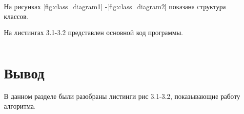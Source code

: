 На рисунках \ref{fig:class_diagram1} -\ref{fig:class_diagram2} показана структура классов.

\begin{figure}[ht!]
\end{figure}

\begin{figure}[ht!]
\end{figure}

На листингах 3.1-3.2 представлен основной код программы.

\begin{lstlisting}[label=some-code,caption=Трассировка лучей.]
\end{lstlisting}

\section{Вывод}

В данном разделе были разобраны листинги рис 3.1-3.2, показывающие работу алгоритма.